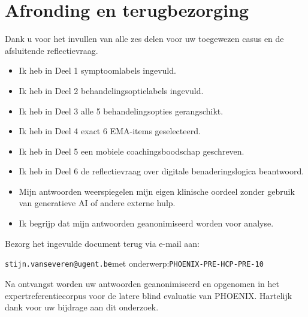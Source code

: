\documentclass[11pt,a4paper]{article}
\begin{document}
\section{Afronding en terugbezorging}

Dank u voor het invullen van alle zes delen voor uw toegewezen casus
en de afsluitende reflectievraag.

\begin{instrbox}[title=Checklist voor terugbezorging]
\begin{itemize}
\item[$\square$] Ik heb in Deel 1 symptoomlabels ingevuld.
\item[$\square$] Ik heb in Deel 2 behandelingsoptielabels ingevuld.
\item[$\square$] Ik heb in Deel 3 alle 5 behandelingsopties gerangschikt.
\item[$\square$] Ik heb in Deel 4 exact 6 EMA-items geselecteerd.
\item[$\square$] Ik heb in Deel 5 een mobiele coachingsboodschap geschreven.
\item[$\square$] Ik heb in Deel 6 de reflectievraag over digitale benaderingslogica beantwoord.
\item[$\square$] Mijn antwoorden weerspiegelen mijn eigen klinische oordeel zonder gebruik van generatieve AI of andere externe hulp.
\item[$\square$] Ik begrijp dat mijn antwoorden geanonimiseerd worden voor analyse.
\end{itemize}
\end{instrbox}

\medskip
Bezorg het ingevulde document terug via e-mail aan:
\begin{center}
\texttt{stijn.vanseveren@ugent.be}\quad met onderwerp:\quad \texttt{PHOENIX-PRE-HCP-PRE-10}
\end{center}

\vspace{0.5em}
\begin{tcolorbox}[colback=AccentBlue,colframe=PrimaryBlue,arc=2mm,boxrule=0.6pt,left=8pt,right=8pt,top=7pt,bottom=7pt]
\small\centering
Na ontvangst worden uw antwoorden geanonimiseerd en opgenomen in het expertreferentiecorpus
voor de latere blind evaluatie van PHOENIX. Hartelijk dank voor uw bijdrage aan dit onderzoek.
\end{tcolorbox}
\end{document}
